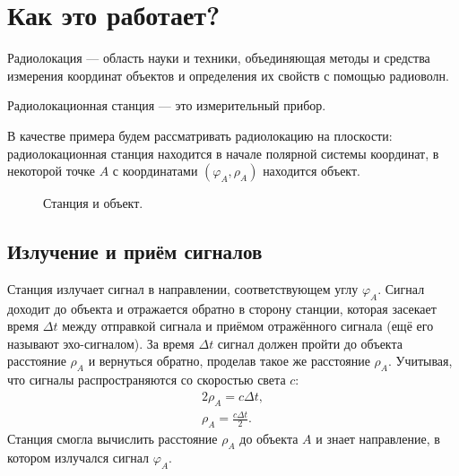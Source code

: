 \section{Как это работает?}

Радиолокация --- область науки и техники, объединяющая методы и средства измерения координат объектов и определения их свойств
с помощью радиоволн.

Радиолокационная станция --- это измерительный прибор.

В качестве примера будем рассматривать радиолокацию на плоскости: радиолокационная станция находится в начале полярной системы координат,
в некоторой точке $A$ с координатами $(\varphi_A, \rho_A)$ находится объект.

\begin{figure}[!ht]
    \centering
    \caption{Станция и объект.}
\end{figure}

\subsection{Излучение и приём сигналов}

Станция излучает сигнал в направлении, соответствующем углу $\varphi_A$. Сигнал доходит до объекта и отражается обратно в сторону станции,
которая засекает время $\Delta t$ между отправкой сигнала и приёмом отражённого сигнала (ещё его называют эхо-сигналом). За время $\Delta t$ сигнал должен
пройти до объекта расстояние $\rho_A$ и вернуться обратно, проделав такое же расстояние $\rho_A$. Учитывая, что сигналы распространяются со
скоростью света $c$:
\begin{gather*}
    2 \rho_A = c \Delta t , \\
    \rho_A = \frac{c \Delta t}{2} .
\end{gather*}
Станция смогла вычислить расстояние $\rho_A$ до объекта $A$ и знает направление, в котором излучался сигнал $\varphi_A$.

